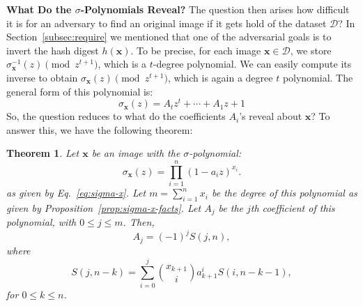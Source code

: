 \documentclass[pdflatex,sn-mathphys-num]{sn-jnl}
\newcommand{\descr}[1]{\vspace{0.2cm} \noindent \textbf{#1}}
\newtheorem{theorem}{Theorem}
\theoremstyle{definition}
\newcommand{\vtr}[1]{\mathbf{#1}}
\newcommand{\database}{\mathcal{D}}
\begin{document}
\descr{What Do the $\sigma$-Polynomials Reveal?}
The question then arises how difficult it is for an adversary to find an original image if it gets hold of the dataset $\database$? In Section~\ref{subsec:require} we mentioned that one of the adversarial goals is to invert the hash digest $h(\vtr{x})$. To be precise, for each image $\vtr{x} \in \database$, we store $\sigma_{\vtr{x}}^{-1}(z) \pmod{z^{t+1}}$, which is a $t$-degree polynomial. We can easily compute its inverse to obtain $\sigma_{\vtr{x}}(z) \pmod{z^{t+1}}$, which is again a degree $t$ polynomial. The general form of this polynomial is: 
\[
 \sigma_\vtr{x}(z) = A_{t}z^t + \cdots + A_1z + 1
\]
So, the question reduces to what do the coefficients $A_i$'s reveal about $\vtr{x}$? 
To answer this, we have the following theorem:
\begin{theorem}
\label{theo:relabel}
Let $\vtr{x}$ be an image with the $\sigma$-polynomial:
\[
\sigma_{\vtr{x}}(z) = \prod_{i=1}^n (1 - a_iz)^{x_i}.
\]
as given by Eq.~\eqref{eq:sigma-x}. Let $m = \sum_{i=1}^n x_i$ be the degree of this polynomial as given by Proposition~\ref{prop:sigma-x-facts}. Let $A_j$ be the $j$th coefficient of this polynomial, with $0 \leq j \leq m$. Then, 
\[
A_j = (-1)^j S(j, n),
\]
where 
\[
S(j, n - k) = \sum_{i = 0}^j \binom{x_{k+1}}{i}a_{k+1}^i S(i, n-k-1),
\]
for $0 \leq k \leq n$. 
\end{theorem}
\end{document}
